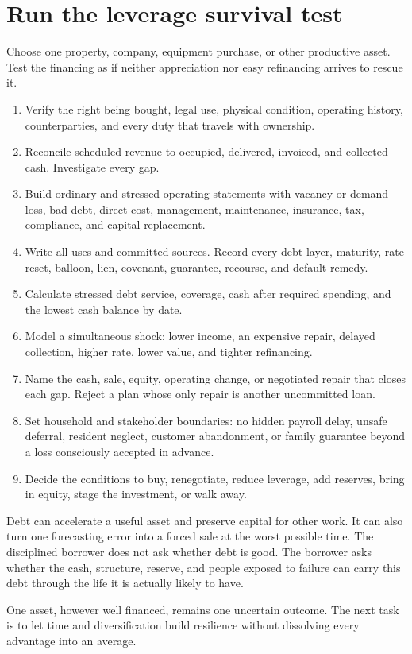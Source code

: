 \section{Run the leverage survival test}
\enlargethispage{2\baselineskip}

Choose one property, company, equipment purchase, or other productive asset.
Test the financing as if neither appreciation nor easy refinancing arrives to
rescue it.

\begin{enumerate}[itemsep=0.14em]
\item Verify the right being bought, legal use, physical condition, operating
  history, counterparties, and every duty that travels with ownership.
\item Reconcile scheduled revenue to occupied, delivered, invoiced, and
  collected cash. Investigate every gap.
\item Build ordinary and stressed operating statements with vacancy or demand
  loss, bad debt, direct cost, management, maintenance, insurance, tax,
  compliance, and capital replacement.
\item Write all uses and committed sources. Record every debt layer, maturity,
  rate reset, balloon, lien, covenant, guarantee, recourse, and default remedy.
\item Calculate stressed debt service, coverage, cash after required spending,
  and the lowest cash balance by date.
\item Model a simultaneous shock: lower income, an expensive repair, delayed
  collection, higher rate, lower value, and tighter refinancing.
\item Name the cash, sale, equity, operating change, or negotiated repair that
  closes each gap. Reject a plan whose only repair is another uncommitted loan.
\item Set household and stakeholder boundaries: no hidden payroll delay,
  unsafe deferral, resident neglect, customer abandonment, or family guarantee
  beyond a loss consciously accepted in advance.
\item Decide the conditions to buy, renegotiate, reduce leverage, add reserves,
  bring in equity, stage the investment, or walk away.
\end{enumerate}

Debt can accelerate a useful asset and preserve capital for other work. It can
also turn one forecasting error into a forced sale at the worst possible time.
The disciplined borrower does not ask whether debt is good. The borrower asks
whether the cash, structure, reserve, and people exposed to failure can carry
this debt through the life it is actually likely to have.

One asset, however well financed, remains one uncertain outcome. The next task
is to let time and diversification build resilience without dissolving every
advantage into an average.
